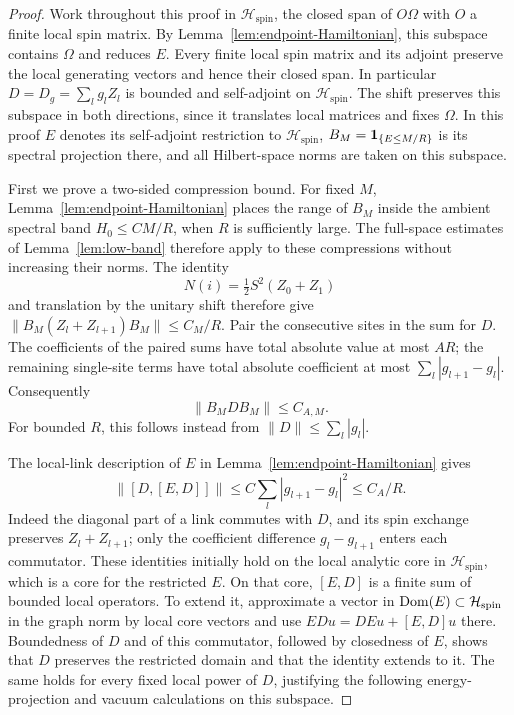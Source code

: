 \begin{proof}
Work throughout this proof in \(\mathcal H_{\mathrm{spin}}\), the closed
span of \(O\Omega\) with \(O\) a finite local spin matrix.
By Lemma~\ref{lem:endpoint-Hamiltonian}, this subspace contains
\(\Omega\) and reduces \(E\). Every finite local spin matrix and its
adjoint preserve the local generating vectors and hence their closed
span. In particular \(D=D_g=\sum_lg_lZ_l\) is bounded and self-adjoint
on \(\mathcal H_{\mathrm{spin}}\). The shift preserves this subspace
in both directions, since it translates local matrices and fixes
\(\Omega\). In this proof \(E\) denotes its self-adjoint restriction
to \(\mathcal H_{\mathrm{spin}}\),
\(B_M=\mathbf1_{\{E\le M/R\}}\) is its spectral projection there, and
all Hilbert-space norms are taken on this subspace.

First we prove a two-sided compression bound. For fixed \(M\),
Lemma~\ref{lem:endpoint-Hamiltonian} places the range of \(B_M\)
inside the ambient spectral band \(H_0\le C M/R\), when \(R\) is
sufficiently large. The full-space estimates of Lemma~\ref{lem:low-band}
therefore apply to these compressions without increasing their norms.
The identity
\[
 N(i)=\tfrac12S^2(Z_0+Z_1)
\]
and translation by the unitary shift therefore give
\(\|B_M(Z_l+Z_{l+1})B_M\|\le C_M/R\).
Pair the consecutive sites in the sum for \(D\). The coefficients of the
paired sums have total absolute value at most \(AR\); the remaining
single-site terms have total absolute coefficient at most
\(\sum_l|g_{l+1}-g_l|\). Consequently
\begin{equation}\label{eq:prob-two-sided}
 \|B_MDB_M\|\le C_{A,M}.
\end{equation}
For bounded \(R\), this follows instead from
\(\|D\|\le\sum_l|g_l|\).

The local-link description of \(E\) in
Lemma~\ref{lem:endpoint-Hamiltonian} gives
\begin{equation}\label{eq:prob-double-commutator}
 \|[D,[E,D]]\|\le C\sum_l|g_{l+1}-g_l|^2\le C_A/R.
\end{equation}
Indeed the diagonal part of a link commutes with \(D\), and its spin
exchange preserves \(Z_l+Z_{l+1}\); only the coefficient difference
\(g_l-g_{l+1}\) enters each commutator. These identities initially hold
on the local analytic core in \(\mathcal H_{\mathrm{spin}}\), which is
a core for the restricted \(E\). On that core, \([E,D]\) is a finite
sum of bounded local operators. To extend it, approximate a vector in
\(\operatorname{Dom}(E)\subset\mathcal H_{\mathrm{spin}}\) in the graph norm by local
core vectors and use \(EDu=DEu+[E,D]u\) there. Boundedness of \(D\)
and of this commutator, followed by closedness of \(E\), shows that
\(D\) preserves the restricted domain and that the identity extends to
it. The same holds for every fixed local power of \(D\), justifying
the following energy-projection and vacuum calculations on this subspace.


\end{proof}
